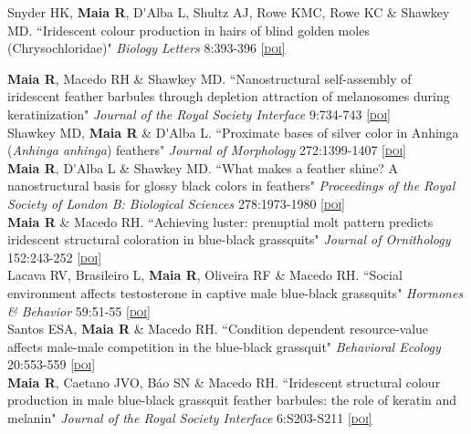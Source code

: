 \documentclass[10pt]{article}
\newcommand{\doi}[1]{\href{http://dx.doi.org/#1}{\scriptsize\textsc{[doi]}}}
\newcommand{\years}[1]{\marginnote{\raggedleft\scriptsize #1}}
\begin{document}
\years{} Snyder HK,  \textbf{Maia R}, D\'{}Alba L, Shultz AJ, Rowe KMC, Rowe KC \& Shawkey MD. “Iridescent colour production in hairs of blind golden moles (Chrysochloridae)" \emph{Biology Letters} 8:393-396 \doi{10.1098/rsbl.2011.1168}\\

\vspace{5 mm}

\years{}  \textbf{Maia R}, Macedo RH \& Shawkey MD. “Nanostructural self-assembly of iridescent feather barbules through depletion attraction of melanosomes during keratinization" \emph{Journal of the Royal Society Interface} 9:734-743 \doi{10.1098/rsif.2011.0456}\\

\years{2011} Shawkey MD,  \textbf{Maia R} \& D\'{}Alba L. “Proximate bases of silver color in Anhinga (\emph{Anhinga anhinga}) feathers" \emph{Journal of Morphology} 272:1399-1407 \doi{10.1002/jmor.10993}\\

\years{}  \textbf{Maia R}, D\'{}Alba L \& Shawkey MD. “What makes a feather shine? A nanostructural basis for glossy black colors in feathers" \emph{Proceedings of the Royal Society of London B: Biological Sciences} 278:1973-1980 \doi{10.1098/rspb.2010.1637}\\

\years{}  \textbf{Maia R} \& Macedo RH. “Achieving luster: prenuptial molt pattern predicts iridescent structural coloration in blue-black grassquits" \emph{Journal of Ornithology} 152:243-252 \doi{10.1007/s10336-010-0576-y}\\

\years{2010} Lacava RV, Brasileiro L,  \textbf{Maia R}, Oliveira RF \& Macedo RH. “Social environment affects testosterone in captive male blue-black grassquits" \emph{Hormones \& Behavior} 59:51-55 \doi{10.1016/j.yhbeh.2010.10.003}\\

\years{2009} Santos ESA,  \textbf{Maia R} \& Macedo RH. “Condition dependent resource-value affects male-male competition in the blue-black grassquit" \emph{Behavioral Ecology} 20:553-559 \doi{10.1093/beheco/arp031}\\

\years{}  \textbf{Maia R}, Caetano JVO, B\'{a}o SN \& Macedo RH. “Iridescent structural colour production in male blue-black grassquit feather barbules: the role of keratin and melanin" \emph{Journal of the Royal Society Interface} 6:S203-S211 \doi{10.1098/rsif.2008.0460.focus}\\
\end{document}

